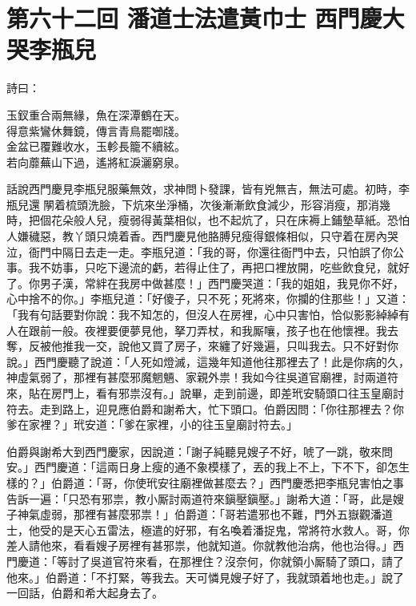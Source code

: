 
\chapter*{第六十二回 潘道士法遣黃巾士 西門慶大哭李瓶兒}


詩曰：

\begin{myquote}
玉釵重合兩無緣，魚在深潭鶴在天。\\得意紫鸞休舞鏡，傳言青鳥罷啣牋。\\金盆已覆難收水，玉軫長籠不續絃。\\若向蘼蕪山下過，遙將紅淚灑窮泉。
\end{myquote}

話說西門慶見李瓶兒服藥無效，求神問卜發課，皆有兇無吉，無法可處。初時，李瓶兒還𨴃䦛着梳頭洗臉，下炕來坐淨桶，次後漸漸飲食減少，形容消瘦，那消幾時，把個花朵般人兒，瘦弱得黃葉相似，也不起炕了，只在床褥上鋪墊草紙。恐怕人嫌穢惡，教丫頭只燒着香。西門慶見他胳膊兒瘦得銀條相似，只守着在房內哭泣，衙門中隔日去走一走。李瓶兒道：「我的哥，你還往衙門中去，只怕誤了你公事。我不妨事，只吃下邊流的虧，若得止住了，再把口裡放開，吃些飲食兒，就好了。你男子漢，常絆在我房中做甚麼！」西門慶哭道：「我的姐姐，我見你不好，心中捨不的你。」李瓶兒道：「好傻子，只不死；死將來，你攔的住那些！」又道：「我有句話要對你說：我不知怎的，但沒人在房裡，心中只害怕，恰似影影綽綽有人在跟前一般。夜裡要便夢見他，拏刀弄杖，和我厮嚷，孩子也在他懷裡。我去奪，反被他推我一交，說他又買了房子，來纏了好幾遍，只叫我去。只不好對你說。」西門慶聽了說道：「人死如燈滅，這幾年知道他往那裡去了！此是你病的久，神虛氣弱了，那裡有甚麼邪魔魍魎、家親外祟！我如今往吳道官廟裡，討兩道符來，貼在房門上，看有邪祟沒有。」說畢，走到前邊，即差玳安騎頭口往玉皇廟討符去。走到路上，迎見應伯爵和謝希大，忙下頭口。伯爵因問：「你往那裡去？你爹在家裡？」玳安道：「爹在家裡，小的往玉皇廟討符去。」

伯爵與謝希大到西門慶家，因說道：「謝子純聽見嫂子不好，唬了一跳，敬來問安。」西門慶道：「這兩日身上瘦的通不象模樣了，丟的我上不上，下不下，卻怎生樣的？」伯爵道：「哥，你使玳安往廟裡做甚麼去？」西門慶悉把李瓶兒害怕之事告訴一遍：「只恐有邪祟，教小厮討兩道符來鎭壓鎭壓。」謝希大道：「哥，此是嫂子神氣虛弱，那裡有甚麼邪祟！」伯爵道：「哥若遣邪也不難，門外五嶽觀潘道士，他受的是天心五雷法，極遣的好邪，有名喚着潘捉鬼，常將符水救人。哥，你差人請他來，看看嫂子房裡有甚邪祟，他就知道。你就教他治病，他也治得。」西門慶道：「等討了吳道官符來看，在那裡住？沒奈何，你就領小厮騎了頭口，請了他來。」伯爵道：「不打緊，等我去。天可憐見嫂子好了，我就頭着地也走。」{}說了一回話，伯爵和希大起身去了。

